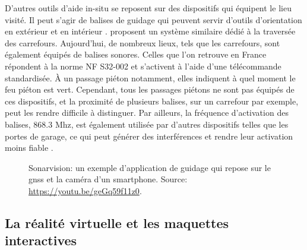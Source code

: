 D'autres outils d'aide in-situ se reposent sur des dispositifs qui équipent le lieu visité. Il peut s'agir de balises de guidage qui peuvent servir d'outils d'orientation en extérieur et en intérieur \citep{Ahmetovic2016, Cheraghi2017}. \citet{Shin2022} proposent un système similaire dédié à la traversée des carrefours. Aujourd'hui, de nombreux lieux, tels que les carrefours, sont également équipés de balises sonores. Celles que l'on retrouve en France répondent à la norme NF S32-002 \citep{NFS32002_2004} et s'activent à l'aide d'une télécommande standardisée. À un passage piéton notamment, elles indiquent à quel moment le feu piéton est vert. Cependant, tous les passages piétons ne sont pas équipés de ces dispositifs, et la proximité de plusieurs balises, sur un carrefour par exemple, peut les rendre difficile à distinguer. Par ailleurs, la fréquence d'activation des balises, 868.3 Mhz, est également utilisée par d'autres dispositifs telles que les portes de garage, ce qui peut générer des interférences et rendre leur activation moins fiable \citep{Rahal2021}.

\begin{figure}[ht]
    \centering
    \caption[Application mobile de guidage]{Sonarvision: un exemple d'application de guidage qui repose sur le \gls{gnss} et la caméra d'un smartphone. Source: \url{https://youtu.be/geGq59f11z0}.}
    \label{fig:dispositif_in_situ}
\end{figure}

\subsection{La réalité virtuelle et les maquettes interactives}

